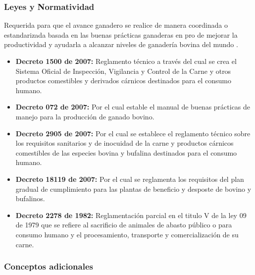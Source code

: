 \subsubsection{Leyes y Normatividad}  \label{leyes}
Requerida para que el avance ganadero se realice de manera coordinada o estandarizada basada en las buenas prácticas ganaderas en pro de mejorar la productividad y ayudarla a alcanzar niveles de ganadería bovina del mundo \cite{invima}. 
\begin{itemize}
	\item \textbf{Decreto 1500 de 2007:} Reglamento técnico a través del cual se crea el Sistema Oficial de Inspección, Vigilancia y Control de la Carne y otros productos comestibles y derivados cárnicos destinados para el consumo humano.
	\item \textbf{Decreto 072 de 2007:} Por el cual estable el manual de buenas prácticas de manejo para la producción de ganado bovino.
	\item \textbf{Decreto 2905 de 2007:} Por el cual se establece el reglamento técnico sobre los requisitos sanitarios y de inocuidad de la carne y productos cárnicos comestibles de las especies bovina y bufalina destinados para el consumo humano.
	\item \textbf{Decreto 18119 de 2007:} Por el cual se reglamenta los requisitos del plan gradual de cumplimiento para  las plantas de beneficio y desposte de bovino y bufalinos.
	\item \textbf{Decreto 2278 de 1982:} Reglamentación parcial en el titulo V de la ley 09 de 1979 que se refiere al sacrificio de animales de abasto público o para consumo humano y el procesamiento, transporte y comercialización de su carne.
\end{itemize}



\subsubsection{Conceptos adicionales}

